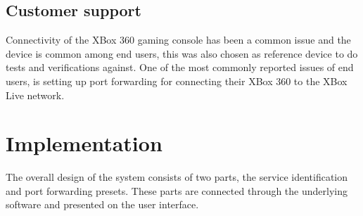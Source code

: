 \documentclass[a4paper,11pt,makeidx]{kth-bcs}
\begin{document}
   \section{Customer support}
Connectivity of the XBox 360 gaming console has been a common issue and the device is common among end users, this was also chosen as reference device to do tests and verifications against.
One of the most commonly reported issues of end users, is setting up port forwarding for connecting their XBox 360 to the XBox Live network.

\chapter{Implementation}
The overall design of the system consists of two parts, the service identification and port forwarding presets.
These parts are connected through the underlying software and presented on the user interface.
\end{document}
